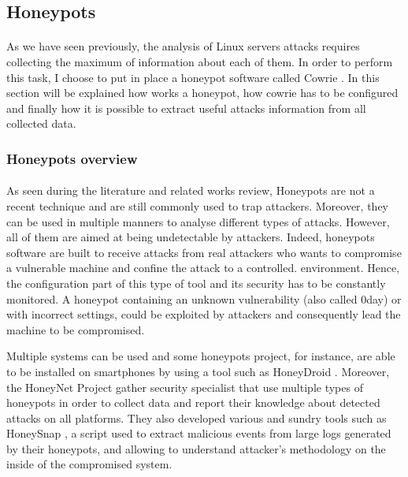 \subsection{Honeypots}

\paragraph{} %

As we have seen previously, the analysis of Linux servers attacks requires collecting the 
maximum of information about each of them. In order to perform this task, I choose to put 
in place a honeypot software called Cowrie \cite{cowrie}.
In this section will be explained how works a honeypot, how cowrie has to be configured and
finally how it is possible to extract useful attacks information from all collected data.

\subsubsection{Honeypots overview} %

\paragraph{}  

As seen during the literature and related works review, Honeypots are not a recent technique
and are still commonly used to trap attackers. Moreover, they can be used in multiple manners
to analyse different types of attacks. However, all of them are aimed at being undetectable 
by attackers. Indeed, honeypots software are built to receive attacks from real attackers
who wants to compromise a vulnerable machine and confine the attack to a controlled. 
environment. Hence, the configuration part of this type of tool and its security has to be
constantly monitored. A honeypot containing an unknown vulnerability (also called 0day) or
with incorrect settings, could be exploited by attackers and consequently lead
the machine to be compromised. 

Multiple systems can be used and some honeypots project, for instance, are able to be
installed on smartphones by using a tool such as HoneyDroid \cite{paperHoneyDroid}. Moreover, the HoneyNet Project \cite{honeynetProject}
gather security specialist that use multiple types of honeypots in order to collect data 
and report their knowledge about detected attacks on all platforms. They also developed 
various and sundry tools such as HoneySnap \cite{honeySnap}, a script used to extract malicious events from 
large logs generated by their honeypots, and allowing to understand attacker's methodology 
on the inside of the compromised system.


